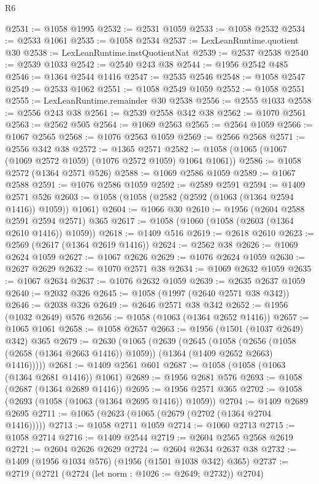 \begin{lexlean}{R6}
\begin{coremodule}
@2531 := @1058 @1995
@2532 := @2531 @1059
@2533 := @1058 @2532
@2534 := @2533 @1061
@2535 := @1058 @2534
@2537 := LexLeanRuntime.quotient @30
@2538 := LexLeanRuntime.instQuotientNat
@2539 := @2537 @2538
@2540 := @2539 @1033
@2542 := @2540 @243 @38
@2544 := @1956 @2542 @485
@2546 := @1364 @2544 @1416
@2547 := @2535 @2546
@2548 := @1058 @2547
@2549 := @2533 @1062
@2551 := @1058 @2549 @1059
@2552 := @1058 @2551
@2555 := LexLeanRuntime.remainder @30 @2538
@2556 := @2555 @1033
@2558 := @2556 @243 @38
@2561 := @2539 @2558 @342 @38
@2562 := @1070 @2561
@2563 := @2562 @505
@2564 := @1069 @2563
@2565 := @2564 @1059
@2566 := @1067 @2565
@2568 := @1076 @2563 @1059
@2569 := @2566 @2568
@2571 := @2556 @342 @38
@2572 := @1365 @2571
@2582 := @1058 (@1065 (@1067 (@1069 @2572 @1059) (@1076 @2572 @1059) @1064 @1061))
@2586 := @1058 @2572 (@1364 @2571 @526)
@2588 := @1069 @2586 @1059
@2589 := @1067 @2588
@2591 := @1076 @2586 @1059
@2592 := @2589 @2591
@2594 := @1409 @2571 @526
@2603 := @1058 (@1058 (@2582 (@2592 (@1063 (@1364 @2594 @1416)) @1059)) @1061)
@2604 := @1066 @30
@2610 := @1956 (@2604 @2588 @2591 @2594 @2571) @365
@2617 := @1058 (@1060 (@1058 (@2603 (@1364 @2610 @1416)) @1059))
@2618 := @1409 @516
@2619 := @2618 @2610
@2623 := @2569 (@2617 (@1364 @2619 @1416))
@2624 := @2562 @38
@2626 := @1069 @2624 @1059
@2627 := @1067 @2626
@2629 := @1076 @2624 @1059
@2630 := @2627 @2629
@2632 := @1070 @2571 @38
@2634 := @1069 @2632 @1059
@2635 := @1067 @2634
@2637 := @1076 @2632 @1059
@2639 := @2635 @2637 @1059
@2640 := @2032 @326
@2645 := @1058 (@1997 (@2640 @2571 @38 @342))
@2646 := @2038 @326
@2649 := @2646 @2571 @38 @342
@2652 := @1956 (@1032 @2649) @576
@2656 := @1058 (@1063 (@1364 @2652 @1416))
@2657 := @1065 @1061
@2658 := @1058 @2657
@2663 := @1956 (@1501 (@1037 @2649) @342) @365
@2679 := @2630
    (@1065
      (@2639
        (@2645
          (@1058
            (@2656 (@1058 (@2658 (@1364 @2663 @1416)) @1059))
            (@1364 (@1409 @2652 @2663) @1416)))))
@2681 := @1409 @2561 @601
@2687 := @1058 (@1058 (@1063 (@1364 @2681 @1416)) @1061)
@2689 := @1956 @2681 @576
@2693 := @1058 (@2687 (@1364 @2689 @1416))
@2695 := @1956 @2571 @365
@2702 := @1058 (@2693 (@1058 (@1063 (@1364 @2695 @1416)) @1059))
@2704 := @1409 @2689 @2695
@2711 := @1065 (@2623 (@1065 (@2679 (@2702 (@1364 @2704 @1416)))))
@2713 := @1058 @2711 @1059
@2714 := @1060 @2713
@2715 := @1058 @2714
@2716 := @1409 @2544
@2719 := @2604 @2565 @2568 @2619
@2721 := @2604 @2626 @2629
@2724 := @2604 @2634 @2637 @38
@2732 := @1409 (@1956 @1034 @576) (@1956 (@1501 @1038 @342) @365)
@2737 := @2719 (@2721 (@2724 (let norm : @1026 := @2649; @2732)) @2704)

\end{coremodule}
\end{lexlean}
